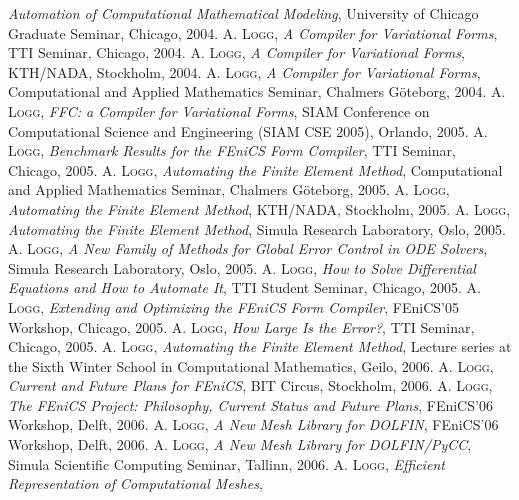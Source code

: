 \begin{thebibliography}{99}
{\textit{Automation of Computational Mathematical Modeling},
University of Chicago Graduate Seminar, Chicago,
2004.
}
 {\textsc{A. Logg},
\textit{A Compiler for Variational Forms},
TTI Seminar, Chicago,
2004.
}
 {\textsc{A. Logg},
\textit{A Compiler for Variational Forms},
KTH/NADA, Stockholm,
2004.
}
 {\textsc{A. Logg},
\textit{A Compiler for Variational Forms},
Computational and Applied Mathematics Seminar, Chalmers G{\"o}teborg,
2004.
}
 {\textsc{A. Logg},
\textit{{FFC}: a Compiler for Variational Forms},
SIAM Conference on Computational Science and Engineering (SIAM CSE 2005), Orlando,
2005.
}
 {\textsc{A. Logg},
\textit{Benchmark Results for the {FE}ni{CS} Form Compiler},
TTI Seminar, Chicago,
2005.
}
 {\textsc{A. Logg},
\textit{Automating the Finite Element Method},
Computational and Applied Mathematics Seminar, Chalmers G{\"o}teborg,
2005.
}
 {\textsc{A. Logg},
\textit{Automating the Finite Element Method},
KTH/NADA, Stockholm,
2005.
}
 {\textsc{A. Logg},
\textit{Automating the Finite Element Method},
Simula Research Laboratory, Oslo,
2005.
}
 {\textsc{A. Logg},
\textit{A New Family of Methods for Global Error Control in {ODE} Solvers},
Simula Research Laboratory, Oslo,
2005.
}
 {\textsc{A. Logg},
\textit{How to Solve Differential Equations and How to Automate It},
TTI Student Seminar, Chicago,
2005.
}
 {\textsc{A. Logg},
\textit{Extending and Optimizing the {FE}ni{CS} Form Compiler},
FEniCS'05 Workshop, Chicago,
2005.
}
 {\textsc{A. Logg},
\textit{How Large Is the Error?},
TTI Seminar, Chicago,
2005.
}
 {\textsc{A. Logg},
\textit{Automating the Finite Element Method},
Lecture series at the Sixth Winter School in Computational Mathematics, Geilo,
2006.
}
 {\textsc{A. Logg},
\textit{Current and Future Plans for {FE}ni{CS}},
BIT Circus, Stockholm,
2006.
}
 {\textsc{A. Logg},
\textit{The {FE}ni{CS} Project: Philosophy, Current Status and Future Plans},
FEniCS'06 Workshop, Delft,
2006.
}
 {\textsc{A. Logg},
\textit{A New Mesh Library for {DOLFIN}},
FEniCS'06 Workshop, Delft,
2006.
}
 {\textsc{A. Logg},
\textit{A New Mesh Library for {DOLFIN}/{P}y{CC}},
Simula Scientific Computing Seminar, Tallinn,
2006.
}
 {\textsc{A. Logg},
\textit{Efficient Representation of Computational Meshes},
}
\end{thebibliography}
